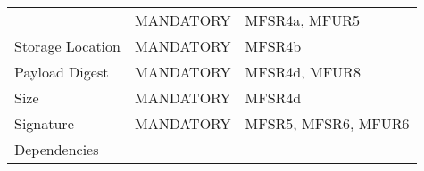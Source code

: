 \documentclass[0-thesis.tex]{subfiles}
\begin{document}
\begin{longtable}[]{@{}lll@{}}
\begin{minipage}[t]{0.32\columnwidth}
    \end{minipage} & \begin{minipage}[t]{0.36\columnwidth}\raggedright\strut
    MANDATORY\strut \end{minipage} &
    \begin{minipage}[t]{0.23\columnwidth}\raggedright\strut MFSR4a, MFUR5\strut
    \end{minipage}\tabularnewline
    \begin{minipage}[t]{0.32\columnwidth}\raggedright\strut Storage Location\strut
    \end{minipage} & \begin{minipage}[t]{0.36\columnwidth}\raggedright\strut
    MANDATORY\strut \end{minipage} &
    \begin{minipage}[t]{0.23\columnwidth}\raggedright\strut MFSR4b\strut
    \end{minipage}\tabularnewline
    \begin{minipage}[t]{0.32\columnwidth}\raggedright\strut Payload Digest\strut
    \end{minipage} & \begin{minipage}[t]{0.36\columnwidth}\raggedright\strut
    MANDATORY\strut \end{minipage} &
    \begin{minipage}[t]{0.23\columnwidth}\raggedright\strut MFSR4d, MFUR8\strut
    \end{minipage}\tabularnewline
    \begin{minipage}[t]{0.32\columnwidth}\raggedright\strut Size\strut \end{minipage} &
    \begin{minipage}[t]{0.36\columnwidth}\raggedright\strut MANDATORY\strut \end{minipage}
    & \begin{minipage}[t]{0.23\columnwidth}\raggedright\strut MFSR4d\strut
    \end{minipage}\tabularnewline
    \begin{minipage}[t]{0.32\columnwidth}\raggedright\strut Signature\strut \end{minipage}
    & \begin{minipage}[t]{0.36\columnwidth}\raggedright\strut MANDATORY\strut
    \end{minipage} & \begin{minipage}[t]{0.23\columnwidth}\raggedright\strut MFSR5, MFSR6,
    MFUR6\strut \end{minipage}\tabularnewline
    \begin{minipage}[t]{0.32\columnwidth}\raggedright\strut Dependencies\strut

\end{minipage}
\end{longtable}
\end{document}
